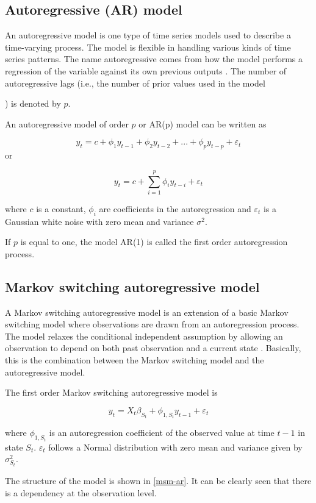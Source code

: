 \subsection{Autoregressive (AR) model}

An autoregressive model is one type of time series models used to
describe a time-varying process. The model is flexible in handling
various kinds of time series patterns. The name autoregressive comes
from how the model performs a regression of the variable against its
own previous outputs \citep{cryer1986time}. The number of autoregressive
lags (i.e., the number of prior values used in the model%

) is denoted by $p$. 
\begin{defn}
An autoregressive model of order $p$ or AR(p) model can be written
as 

\[
y_{t}=c+\phi_{1}y_{t-1}+\phi_{2}y_{t-2}+...+\phi_{p}y_{t-p}+\varepsilon_{t}
\]
or

\[
y_{t}=c+\sum_{i=1}^{p}\phi_{i}y_{t-i}+\varepsilon_{t}
\]

where $c$ is a constant, $\phi_{i}$ are coefficients in the autoregression
and $\varepsilon_{t}$ is a Gaussian white noise with zero mean and
variance $\sigma^{2}$.
\end{defn}
If $p$ is equal to one, the model AR(1) is called the first order
autoregression process.

\subsection{Markov switching autoregressive model}

A Markov switching autoregressive model is an extension of a basic
Markov switching model where observations are drawn from an autoregression
process. The model relaxes the conditional independent assumption
by allowing an observation to depend on both past observation and
a current state \citep{shannon2009formulation}. Basically, this is
the combination between the Markov switching model and the autoregressive
model.
\begin{defn}
The first order Markov switching autoregressive model is 

\[
y_{t}=X_{t}\beta_{S_{t}}+\phi_{1,S_{t}}y_{t-1}+\varepsilon_{t}
\]

where $\phi_{1,S_{t}}$ is an autoregression coefficient of the observed
value at time $t-1$ in state $S_{t}$. $\varepsilon_{t}$ follows
a Normal distribution with zero mean and variance given by $\sigma_{S_{t}}^{2}$.
\end{defn}
The structure of the model is shown in \ref{msm-ar}. It can be clearly
seen that there is a dependency at the observation level.%

